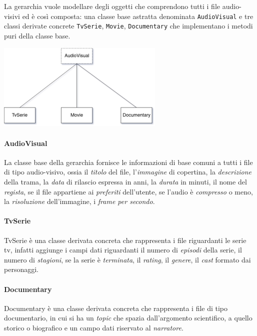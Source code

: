 La gerarchia vuole modellare degli oggetti che comprendono tutti i file audio-visivi ed è così composta: una classe base astratta denominata \texttt{AudioVisual} e tre classi derivate concrete \texttt{TvSerie}, \texttt{Movie}, \texttt{Documentary} che implementano i metodi puri della classe base. 

\begin{center}
    \includegraphics[width=0.6\textwidth]{gerarchia}
\end{center}

\paragraph{AudioVisual}
La classe base della gerarchia fornisce le informazioni di base comuni a tutti i file di tipo audio-visivo, ossia il \textit{titolo} del file, l'\textit{immagine} di copertina, la \textit{descrizione} della trama, la \textit{data} di rilascio espressa in anni, la \textit{durata} in minuti, il nome del \textit{regista}, se il file appartiene ai \textit{preferiti} dell'utente, se l'audio è \textit{compresso} o meno, la \textit{risoluzione} dell'immagine, i \textit{frame per secondo}.

\paragraph{TvSerie}
TvSerie è una classe derivata concreta che rappresenta i file riguardanti le serie tv, infatti aggiunge i campi dati riguardanti il numero di \textit{episodi} della serie, il numero di \textit{stagioni}, se la serie è \textit{terminata}, il \textit{rating}, il \textit{genere}, il \textit{cast} formato dai personaggi.

\paragraph{Documentary}
Documentary è una classe derivata concreta che rappresenta i file di tipo documentario, in cui si ha un \textit{topic} che spazia dall'argomento scientifico, a quello storico o biografico e un campo dati riservato al \textit{narratore}.

